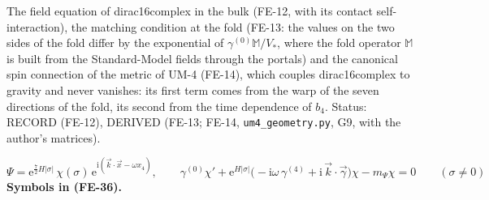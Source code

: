 \documentclass[
  10pt,
]{article}
\begin{document}
The field equation of dirac16complex in the bulk (FE-12, with its
contact self-interaction), the matching condition at the fold (FE-13:
the values on the two sides of the fold differ by the exponential of
\(\gamma^{(0)}\mathbb{M}/V_*\), where the fold operator \(\mathbb{M}\)
is built from the Standard-Model fields through the portals) and the
canonical spin connection of the metric of UM-4 (FE-14), which couples
dirac16complex to gravity and never vanishes: its first term comes from
the warp of the seven directions of the fold, its second from the time
dependence of \(b_4\). Status: RECORD (FE-12), DERIVED (FE-13; FE-14,
\texttt{um4\_geometry.py}, G9, with the author's matrices).

\[
\Psi = \mathrm{e}^{\frac72H\lvert\sigma\rvert}\,\chi(\sigma)\,\mathrm{e}^{\mathrm{i}(\vec k\cdot\vec x - \omega x_4)},\qquad
\gamma^{(0)}\chi' + \mathrm{e}^{H\lvert\sigma\rvert}\big(-\mathrm{i}\omega\,\gamma^{(4)} + \mathrm{i}\,\vec k\cdot\vec\gamma\big)\chi
 - m_\Psi\chi = 0\qquad(\sigma \ne 0) \tag{FE-36}
\] \textbf{Symbols in (FE-36).}
\end{document}

